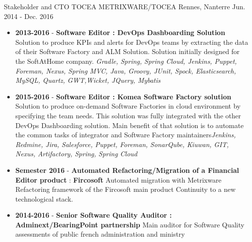 \begin{cventries}
\cventry
{Stakeholder and CTO TOCEA} %
{METRIXWARE/TOCEA} %
{Rennes, Nanterre} %
{Jun. 2014 - Dec. 2016} %
{
\begin{itemize}
\item {\textbf{2013-2016 } - \textbf{Software Editor : DevOps Dashboarding Solution} Solution to produce KPIs and alerts for DevOps teams by extracting the data of their Software Factory and ALM Solution. Solution initially designed for the SoftAtHome company. \newline \textit{Gradle, Spring, Spring Cloud, Jenkins, Puppet, Foreman, Nexus, Spring MVC, Java, Groovy, JUnit, Spock, Elasticsearch, MySQL, Quartz, GWT,Wicket, JQuery, Mybatis}}
\item {\textbf{2015-2016 } - \textbf{Software Editor : Komea Software Factory solution} Solution to produce on-demand Software Factories in cloud environment by specifying the team needs. This solution was fully integrated with the other DevOps Dashboarding solution. Main benefit of that solution is to automate the common tasks of integrator and Software Factory maintainers\newline \textit{Jenkins, Redmine, Jira, Salesforce, Puppet, Foreman, SonarQube, Kiuwan, GIT, Nexus, Artifactory, Spring, Spring Cloud}}
\item \textbf{Semester 2016} - {\textbf{\textbf{Automated Refactoring/Migration} of a Financial Editor product} : \textbf{Fircosoft} Automated migration with Metrixware Refactoring framework of the Fircosoft main product Continuity to a new technological stack. }
\item { \textbf{2014-2016 } - \textbf{Senior Software Quality Auditor : Adminext/BearingPoint partnership } Main auditor for Software Quality assessments of public french administration and ministry}

\end{itemize}}
\end{cventries}
